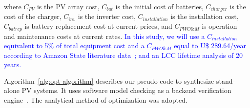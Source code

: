 \documentclass[runningheads]{llncs}
\begin{document}
\noindent where $C_{PV}$ is the PV array cost, $C_{bat}$ is the initial cost of batteries, $C_{charger}$ is the cost of the charger, $C_{inv}$ is the inverter cost, $C_{installation}$ is the installation cost, $C_{batrep}$ is battery replacement cost at current prices, and $C_{PWO\&M}$ is operation and maintenance costs at current rates. \textcolor{blue}{In this study, we will use a $C_{installation}$ equivalent to 5\% of total equipment cost and a $C_{PWO\&M}$ equal to U\$ 289.64/year according to Amazon State literature data~\cite{Agrener2013}; and an LCC lifetime analysis of 20 years.}

Algorithm~\ref{alg:opt-algorithm} describes our pseudo-code to synthesize stand-alone PV systems. It uses software model checking as a backend verification engine~\cite{DBLP:journals/corr/abs-1909-13139}. The analytical method of optimization was adopted.
\end{document}
